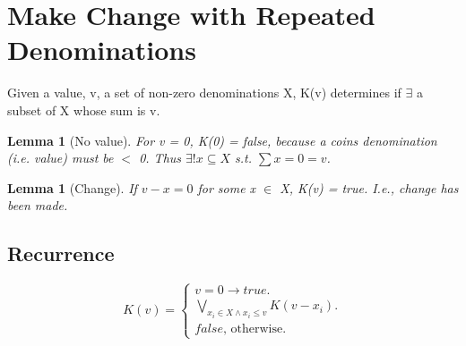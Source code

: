 \documentclass{article}
\newtheorem{lemma}[theorem]{Lemma}
\begin{document}
	
\section{Make Change with Repeated Denominations}
Given a value, v, a set of non-zero denominations X, K(v) determines if $\exists$ a subset of X whose sum is v.

\begin{lemma} [No value]
\label{bc1}	
For v = 0, K(0) = false, because a coins denomination (i.e. value) must be $<$ 0. Thus $\exists! x \subseteq X$ s.t. $\sum x = 0 = v$.
\end{lemma}

\begin{lemma} [Change]
\label{bc2}	
If $v - x = 0$ for some x $\in$ X, K(v) = true. I.e., change has been made.
\end{lemma}

\subsection{Recurrence}
\begin{equation}
K(v)=			
\begin{cases}
v = 0 \to true.\\	
\underset{x_i \in X \land x_i \leq v}{\bigvee} K(v-x_i).\\
false \text{, otherwise.}
\end{cases}
\end{equation}
\end{document}

